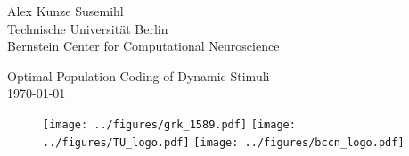 \documentclass[10pt]{article}
\begin{document}
\begin{center}

\Large{Alex Kunze Susemihl}\\
\vspace{10pt}
\large{Technische Universit\"{a}t Berlin\\
Bernstein Center for Computational Neuroscience}\\
\vspace{10pt}

\vspace{70pt}

\Huge{Optimal Population Coding of Dynamic Stimuli}\\
\vspace{30pt}
\today
\vspace{30pt}
\begin{figure}[h]
\texttt{[image: ../figures/grk\_1589.pdf]}
\texttt{[image: ../figures/TU\_logo.pdf]}
\texttt{[image: ../figures/bccn\_logo.pdf]}
\end{figure}

\date{}

\end{center}
\end{document}
